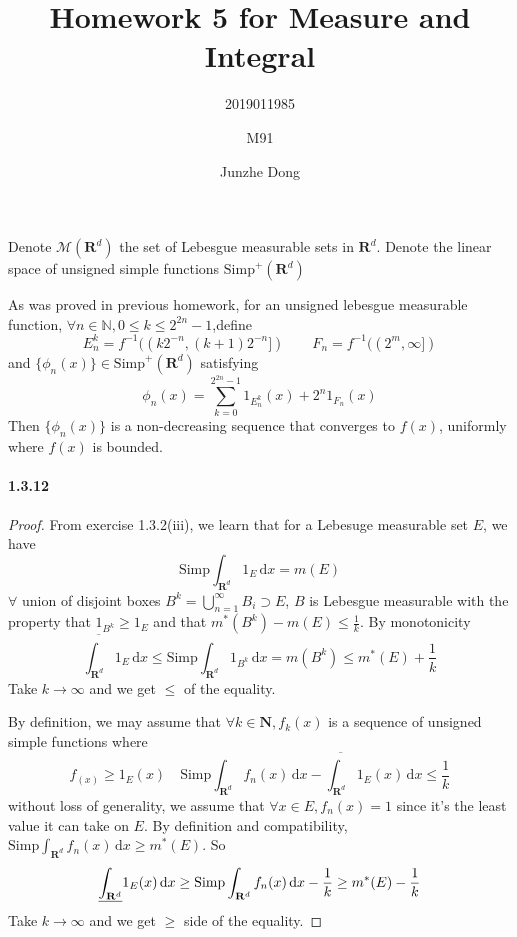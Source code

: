 \documentclass{article}
\author{2019011985\and M91\and Junzhe Dong}
\title{Homework 5 for Measure and Integral}
\begin{document}
\maketitle
\newcommand{\st}{\text{ s.t.}}
\newcommand{\dx}{\,\mathrm{d} x}
\newcommand{\re}{\mathrm{Re}\,}
\newcommand{\im}{\mathrm{Im}\,}
\newcommand{\sip}{\mathrm{Simp}}
\newcommand{\R}{\mathbf{R}^d}
\newcommand{\oit}{\overline{\int_{\R}}}
\newcommand{\uit}{\uline{\int_{\R}}}
\newcommand{\sit}{\sip\int_{\R}}
\newcommand{\cit}{\int_{\R}}
\newcommand{\WLOG}{without loss of generality}
\newcommand{\M}{\mathcal{M}(\R)}
\newcommand{\uspf}{\sip^+({\R})}
\newcommand{\aeeq}{\stackrel{\mathrm{a.e.}}{=}}


\DeclareRobustCommand{\rchi}{{\mathpalette\irchi\relax}}
\newcommand{\irchi}[2]{\raisebox{\depth}{$#1\chi$}} 

Denote $\M$ the set of Lebesgue measurable sets in $\R$. Denote the linear space of unsigned simple functions $\uspf$


As was proved in previous homework, for an unsigned lebesgue measurable function, $\forall n\in\mathbb{N}, 0\leq k\leq 2^{2n}-1$,define
\begin{equation}\label{folland}
E_n^k=f^{-1}((k2^{-n},(k+1)2^{-n}])\qquad F_n=f^{-1}((2^m,\infty])
\end{equation}
and $\{\phi_n(x)\}\in \uspf$ satisfying
\[\phi_n(x)=\sum_{k=0}^{2^{2n}-1}1_{E_n^k}(x)+2^n1_{F_n}(x)\]
Then $\{\phi_n(x)\}$ is a non-decreasing sequence that converges to $f(x)$, uniformly where $f(x)$ is bounded.

\paragraph{1.3.12}
\begin{proof}
From exercise 1.3.2(iii), we learn that for a Lebesuge measurable set $E$, we have
\[\sip\int_{\R}1_{E}\dx=m(E)\]
$\forall$ union of disjoint boxes $B^k=\bigcup_{n=1}^{\infty}B_i\supset E$, $B$ is Lebesgue measurable with the property that $1_{B^k}\geq 1_{E}$ and that $m^*(B^k)-m(E)\leq \frac 1 k$. By monotonicity
\[\oit 1_{E}\dx\leq\sit 1_{B^k}\dx=m(B^k)\leq m^*(E)+\frac 1 k\]
Take $k\to\infty$ and we get $\leq$ of the equality.


By definition, we may assume that $\forall k\in \mathbf{N},f_k(x)$ is a sequence of unsigned simple functions where \[f_(x)\geq 1_{E}(x)\quad\sit f_n(x)\dx-\oit 1_{E}(x)\dx \leq \frac{1}{k}\]
\WLOG , we assume that $\forall x\in E, f_n(x)=1$ since it's the least value it can take on $E$. By definition and compatibility, $\sit f_n(x)\dx \geq m^*(E)$. So
\[\uit 1_{E}(x)\dx \geq \sit f_n(x)\dx -\frac 1 k\geq m^*(E)-\frac 1 k\]
Take $k\to\infty$ and we get $\geq$ side of the equality.
\end{proof}
\end{document}
